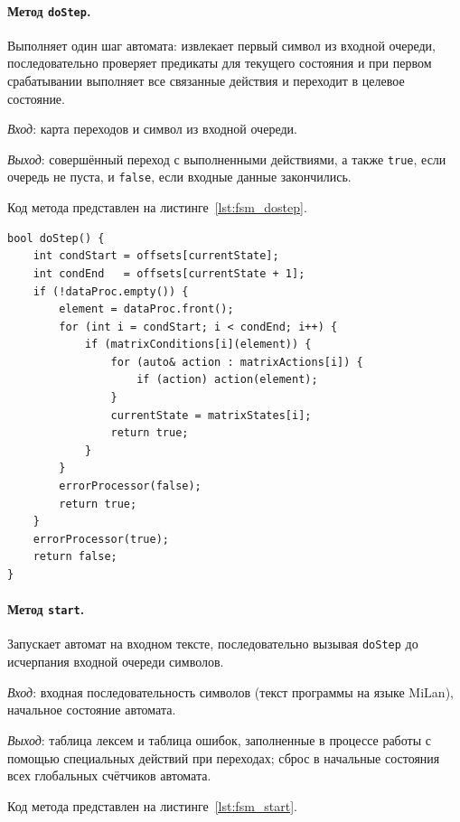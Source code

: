 \documentclass[a4paper,final]{article}
\begin{document}
\paragraph{Метод \texttt{doStep}.} \mbox{}

Выполняет один шаг автомата: извлекает первый символ из входной очереди,
последовательно проверяет предикаты для текущего состояния и при первом
срабатывании выполняет все связанные действия и переходит в целевое состояние.

\textit{Вход}: карта переходов и символ из входной очереди.

\textit{Выход}: совершённый переход с выполненными действиями, а также \texttt{true}, если очередь не пуста, и \texttt{false}, если входные данные закончились.

Код метода представлен на листинге~\ref{lst:fsm_dostep}.

\begin{lstlisting}[caption={Метод FSM::doStep}, label=lst:fsm_dostep]
bool doStep() {
    int condStart = offsets[currentState];
    int condEnd   = offsets[currentState + 1];
    if (!dataProc.empty()) {
        element = dataProc.front();
        for (int i = condStart; i < condEnd; i++) {
            if (matrixConditions[i](element)) {
                for (auto& action : matrixActions[i]) {
                    if (action) action(element);
                }
                currentState = matrixStates[i];
                return true;
            }
        }
        errorProcessor(false);
        return true;
    }
    errorProcessor(true);
    return false;
}
\end{lstlisting}

\paragraph{Метод \texttt{start}.} \mbox{}

Запускает автомат на входном тексте, последовательно вызывая
\texttt{doStep} до исчерпания входной очереди символов.

\textit{Вход}: входная последовательность символов (текст программы на языке
MiLan), начальное состояние автомата.

\textit{Выход}: таблица лексем и таблица ошибок, заполненные в процессе работы с помощью специальных действий при переходах; сброс в начальные состояния всех глобальных счётчиков автомата.

Код метода представлен на листинге~\ref{lst:fsm_start}.
\end{document}
